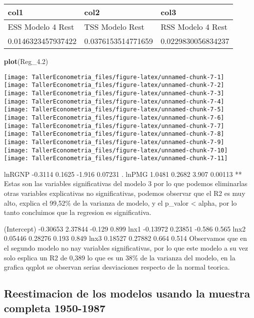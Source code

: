 \documentclass[
]{article}
\newenvironment{Shaded}{\begin{snugshade}}{\end{snugshade}}
\newcommand{\FloatTok}[1]{\textcolor[rgb]{0.00,0.00,0.81}{#1}}
\newcommand{\KeywordTok}[1]{\textcolor[rgb]{0.13,0.29,0.53}{\textbf{#1}}}
\newcommand{\NormalTok}[1]{#1}
\begin{document}
\begin{longtable}[]{@{}lll@{}}
\toprule
col1 & col2 & col3\tabularnewline
\midrule
\endhead
ESS Modelo 4 Rest & TSS Modelo Rest & RSS Modelo 4 Rest\tabularnewline
0.0146323457937422 & 0.0376153514771659 &
0.0229830056834237\tabularnewline
\bottomrule
\end{longtable}

\begin{Shaded}
\begin{Highlighting}[]
\KeywordTok{plot}\NormalTok{(Reg_}\FloatTok{4.2}\NormalTok{)}
\end{Highlighting}
\end{Shaded}

\begin{center}\texttt{[image: TallerEconometria\_files/figure-latex/unnamed-chunk-7-1]} \texttt{[image: TallerEconometria\_files/figure-latex/unnamed-chunk-7-2]} \texttt{[image: TallerEconometria\_files/figure-latex/unnamed-chunk-7-3]} \texttt{[image: TallerEconometria\_files/figure-latex/unnamed-chunk-7-4]} \texttt{[image: TallerEconometria\_files/figure-latex/unnamed-chunk-7-5]} \texttt{[image: TallerEconometria\_files/figure-latex/unnamed-chunk-7-6]} \texttt{[image: TallerEconometria\_files/figure-latex/unnamed-chunk-7-7]} \texttt{[image: TallerEconometria\_files/figure-latex/unnamed-chunk-7-8]} \texttt{[image: TallerEconometria\_files/figure-latex/unnamed-chunk-7-9]} \texttt{[image: TallerEconometria\_files/figure-latex/unnamed-chunk-7-10]} \texttt{[image: TallerEconometria\_files/figure-latex/unnamed-chunk-7-11]} \end{center}

lnRGNP -0.3114 0.1625 -1.916 0.07231 . lnPMG 1.0481 0.2682 3.907 0.00113
** Estas son las variables significativas del modelo 3 por lo que
podemos eliminarlas otras variables explicativas no significativas,
podemos observar que el R2 es muy alto, explica el 99,52\% de la
varianza de modelo, y el p\_valor \textless{} alpha, por lo tanto
concluimos que la regresion es significativa.

(Intercept) -0.30653 2.37844 -0.129 0.899 lnx1 -0.13972 0.23851 -0.586
0.565 lnx2 0.05446 0.28276 0.193 0.849 lnx3 0.18527 0.27882 0.664 0.514
Observamos que en el segundo modelo no nay variables significativas, por
lo que este modelo a su vez solo esplica un R2 de 0,389 lo que es un
38\% de la varianza del modelo, en la grafica qqplot se observan serias
desviaciones respecto de la normal teorica.

\hypertarget{reestimacion-de-los-modelos-usando-la-muestra-completa-1950-1987}{%
\subsection{Reestimacion de los modelos usando la muestra completa
1950-1987}\label{reestimacion-de-los-modelos-usando-la-muestra-completa-1950-1987}}
\end{document}
